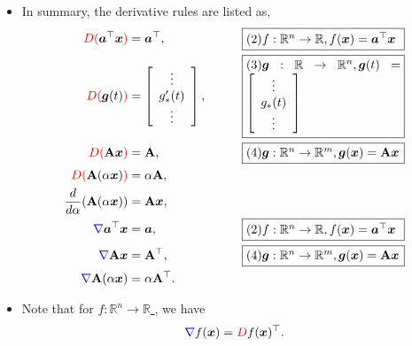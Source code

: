 \documentclass[12pt,thmsa]{article}
\begin{document}
\begin{itemize}
	\item In summary, the derivative rules are listed as,
	\begin{align*}
		{\color{red} D(} \boldsymbol{a}^{\top} \boldsymbol{x} {\color{red})} &= \boldsymbol{a}^{\top}, \qquad &
		\fbox{\parbox{0.36\textwidth}{\( (2) f: \mathbb{R}^{n} \rightarrow \mathbb{R}, f(\boldsymbol{x}) =  \boldsymbol{a}^{\top} \boldsymbol{x} \)}} \\
		{\color{red} D(} \boldsymbol{g}(t) {\color{red})} &=
		\left[ \begin{array}{c} \vdots \\ g_{*}'(t) \\ \vdots \end{array} \right], \qquad &
		\fbox{\parbox{0.36\textwidth}{\( (3) \boldsymbol{g}: \mathbb{R} \rightarrow \mathbb{R}^{n}, \boldsymbol{g}(t) =  \left[ \begin{array}{c} \vdots \\ g_{*}(t) \\ \vdots \end{array} \right] \)}} \\
		{\color{red} D(} \mathbf{A} \boldsymbol{x} {\color{red})} &= {\color{black} \mathbf{A}}, \qquad &
		\fbox{\parbox{0.36\textwidth}{\( (4) \boldsymbol{g}: \mathbb{R}^{n} \rightarrow \mathbb{R}^{m}, \boldsymbol{g}(\boldsymbol{x}) =  \mathbf{A} \boldsymbol{x} \)}} \\
		{\color{red} D(} \mathbf{A}(\alpha \boldsymbol{x}) {\color{red})} &= {\color{black} \alpha \mathbf{A}}, \\
		\frac{d}{d \alpha}( {\color{black}\mathbf{A}(\alpha \boldsymbol{x})} ) &= {\color{black} \mathbf{A} \boldsymbol{x}}, \\
		{\color{blue}\nabla} \boldsymbol{a}^{\top} \boldsymbol{x} &= \boldsymbol{a},  \qquad & 
		\fbox{\parbox{0.36\textwidth}{\( (2) f: \mathbb{R}^{n} \rightarrow \mathbb{R}, f(\boldsymbol{x}) =  \boldsymbol{a}^{\top} \boldsymbol{x} \)}} \\
		{\color{blue}\nabla} \mathbf{A} \boldsymbol{x} &= \mathbf{A}^{\top}, \qquad & 
		\fbox{\parbox{0.36\textwidth}{\( (4) \boldsymbol{g}: \mathbb{R}^{n} \rightarrow \mathbb{R}^{m}, \boldsymbol{g}(\boldsymbol{x}) =  \mathbf{A} \boldsymbol{x} \)}} \\
		{\color{blue}\nabla} \mathbf{A}(\alpha \boldsymbol{x}) &=  \alpha \mathbf{A}^{\top}. \\
	\end{align*}
	
	\item Note that for \underline{ \(f: \mathbb{R}^n \rightarrow \mathbb{R}\) }, we have
	\[
	{\color{blue} \nabla} f(\boldsymbol{x})={\color{red} D} f(\boldsymbol{x})^{\top}.
	\]
\end{itemize}
\end{document}

